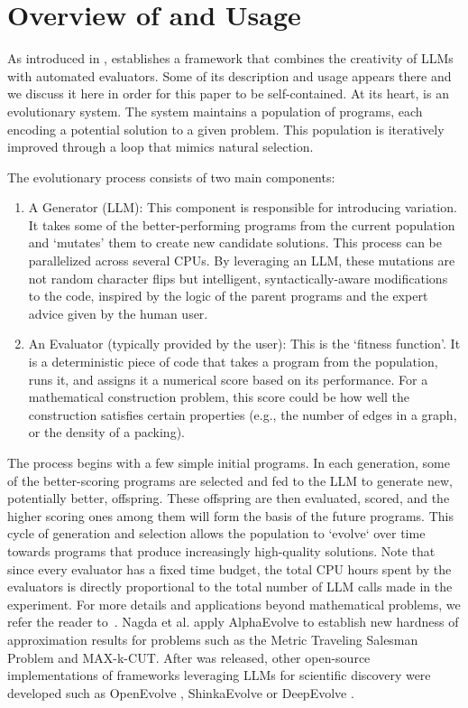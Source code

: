\section{Overview of \AlphaEvolve and Usage} \label{sec:overview-ae}

As introduced in \cite{novikov2025alphaevolve}, \AlphaEvolve establishes a framework that combines the creativity of LLMs with automated evaluators. Some of its description and usage appears there and we discuss it here in order for this paper to be self-contained.  At its heart, \AlphaEvolve is an evolutionary system. The system maintains a population of programs, each encoding a potential solution to a given problem. This population is iteratively improved through a loop that mimics natural selection.

The evolutionary process consists of two main components:
\begin{enumerate}
    \item A Generator (LLM): This component is responsible for introducing variation. It takes some of the better-performing programs from the current population and `mutates' them to create new candidate solutions. This process can be parallelized across several CPUs. By leveraging an LLM, these mutations are not random character flips but intelligent, syntactically-aware modifications to the code, inspired by the logic of the parent programs and the expert advice given by the human user.
    \item An Evaluator (typically provided by the user): This is the `fitness function'. It is a deterministic piece of code that takes a program from the population, runs it, and assigns it a numerical score based on its performance. For a mathematical construction problem, this score could be how well the construction satisfies certain properties (e.g., the number of edges in a graph, or the density of a packing).
\end{enumerate}

The process begins with a few simple initial programs. In each generation, some of the better-scoring programs are selected and fed to the LLM to generate new, potentially better, offspring. These offspring are then evaluated, scored, and the higher scoring ones among them will form the basis of the future programs. This cycle of generation and selection allows the population to `evolve` over time towards programs that produce increasingly high-quality solutions. Note that since every evaluator has a fixed time budget, the total CPU hours spent by the evaluators is directly proportional to the total number of LLM calls made in the experiment. For more details and applications beyond mathematical problems, we refer the reader to~\cite{novikov2025alphaevolve}. Nagda et al. \cite{nagda2025reinforced} apply AlphaEvolve to establish new hardness of approximation results for problems such as the Metric Traveling Salesman Problem and MAX-k-CUT. After \AlphaEvolve was released, other open-source implementations of  frameworks leveraging LLMs for scientific discovery were developed such as OpenEvolve \cite{sharma2025openevolve}, ShinkaEvolve \cite{lange2025shinkaevolve} or DeepEvolve \cite{liu2025deepevolve}.


